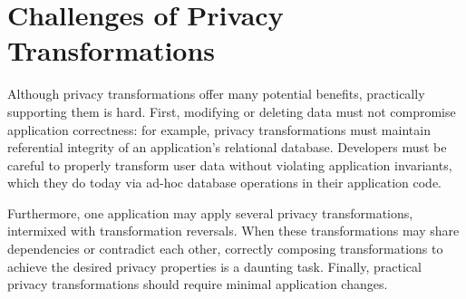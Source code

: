 \section{Challenges of Privacy Transformations}
\label{sec:survey}

%
Although privacy transformations offer many potential benefits, practically supporting them is hard.
First, modifying or deleting data must not compromise application correctness: for example, privacy
transformations must maintain referential integrity of an application's relational database.
Developers must be careful to properly transform user data without violating application invariants,
%
which they do today via ad-hoc database operations in their application code.

Furthermore, one application may apply several privacy transformations, intermixed with
transformation reversals.  When these transformations may share dependencies or contradict each
other, correctly composing transformations to achieve the desired privacy properties is a daunting
task.
%
Finally, practical privacy transformations should require minimal application changes.
%

